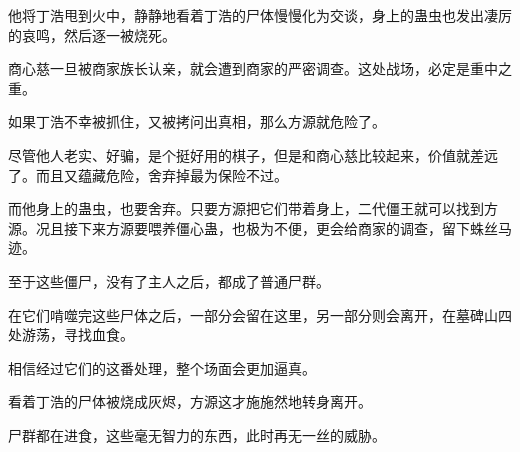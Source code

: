 \begin{this_body}
他将丁浩甩到火中，静静地看着丁浩的尸体慢慢化为交谈，身上的蛊虫也发出凄厉的哀鸣，然后逐一被烧死。

商心慈一旦被商家族长认亲，就会遭到商家的严密调查。这处战场，必定是重中之重。

如果丁浩不幸被抓住，又被拷问出真相，那么方源就危险了。

尽管他人老实、好骗，是个挺好用的棋子，但是和商心慈比较起来，价值就差远了。而且又蕴藏危险，舍弃掉最为保险不过。

而他身上的蛊虫，也要舍弃。只要方源把它们带着身上，二代僵王就可以找到方源。况且接下来方源要喂养僵心蛊，也极为不便，更会给商家的调查，留下蛛丝马迹。

至于这些僵尸，没有了主人之后，都成了普通尸群。

在它们啃噬完这些尸体之后，一部分会留在这里，另一部分则会离开，在墓碑山四处游荡，寻找血食。

相信经过它们的这番处理，整个场面会更加逼真。

看着丁浩的尸体被烧成灰烬，方源这才施施然地转身离开。

尸群都在进食，这些毫无智力的东西，此时再无一丝的威胁。

\end{this_body}

